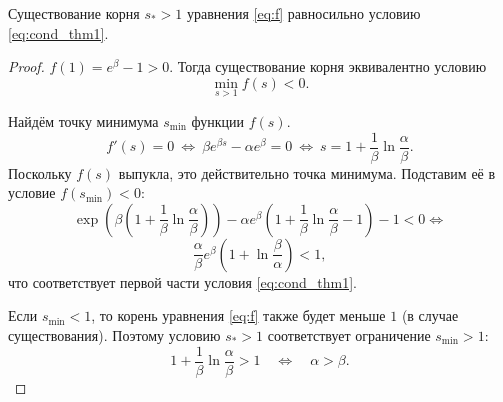 \begin{lemma}
	\label{lm:t1_existence}
	Существование корня $s_* > 1$ уравнения \eqref{eq:f} равносильно условию \eqref{eq:cond_thm1}.
\end{lemma}
\begin{proof}
	$f(1) = e^{\beta} - 1 > 0$. Тогда существование корня эквивалентно условию
	\begin{equation*}
		\min\limits_{s > 1}f(s) < 0.
	\end{equation*}
	
	Найдём точку минимума $s_{\min}$ функции $f(s)$.
	\begin{equation*}
		f'(s) = 0 \ \Leftrightarrow \ \beta e^{\beta s} - \alpha e^{\beta} = 0\ \Leftrightarrow\ s = 1 + \frac{1}{\beta}\ln\frac{\alpha}{\beta}.
	\end{equation*}
	Поскольку $f(s)$ выпукла, это действительно точка минимума. Подставим её в условие $f(s_{\min}) < 0$:
	\begin{equation*}
		\exp\left(\beta (1 + \frac{1}{\beta}\ln\frac{\alpha}{\beta}) \right) - \alpha e^{\beta}(1 + \frac{1}{\beta}\ln\frac{\alpha}{\beta} - 1) - 1 < 0 \Leftrightarrow
	\end{equation*}
	\begin{equation*}
		\frac{\alpha}{\beta}e^{\beta}\left(1 + \ln\frac{\beta}{\alpha}\right) < 1,
	\end{equation*}
	что соответствует первой части условия \eqref{eq:cond_thm1}.
	
	Если $s_{\min} < 1$, то корень уравнения \eqref{eq:f} также будет меньше $1$ (в случае существования). Поэтому условию $s_* > 1$ соответствует ограничение $s_{\min} > 1$:
	\begin{equation*}
		1 + \frac{1}{\beta}\ln\frac{\alpha}{\beta} > 1 \quad \Leftrightarrow \quad \alpha > \beta.
	\end{equation*}
\end{proof}

